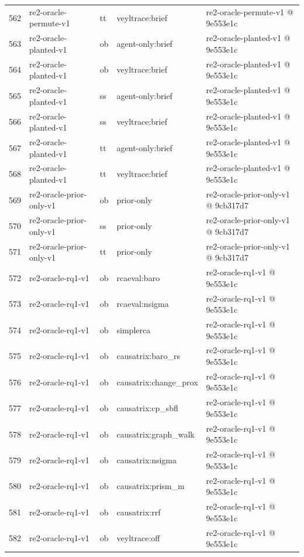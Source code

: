 \begin{longtable}{@{}r>{\raggedright\arraybackslash}p{87.0pt}>{\raggedright\arraybackslash}p{18.0pt}>{\raggedright\arraybackslash}p{63.0pt}>{\raggedright\arraybackslash}p{108.0pt}@{}}
562 & re2-oracle-permute-v1 & tt & veyltrace:brief & re2-oracle-permute-v1 @ 9e553e1c \\
563 & re2-oracle-planted-v1 & ob & agent-only:brief & re2-oracle-planted-v1 @ 9e553e1c \\
564 & re2-oracle-planted-v1 & ob & veyltrace:brief & re2-oracle-planted-v1 @ 9e553e1c \\
565 & re2-oracle-planted-v1 & ss & agent-only:brief & re2-oracle-planted-v1 @ 9e553e1c \\
566 & re2-oracle-planted-v1 & ss & veyltrace:brief & re2-oracle-planted-v1 @ 9e553e1c \\
567 & re2-oracle-planted-v1 & tt & agent-only:brief & re2-oracle-planted-v1 @ 9e553e1c \\
568 & re2-oracle-planted-v1 & tt & veyltrace:brief & re2-oracle-planted-v1 @ 9e553e1c \\
569 & re2-oracle-prior-only-v1 & ob & prior-only & re2-oracle-prior-only-v1 @ 9cb317d7 \\
570 & re2-oracle-prior-only-v1 & ss & prior-only & re2-oracle-prior-only-v1 @ 9cb317d7 \\
571 & re2-oracle-prior-only-v1 & tt & prior-only & re2-oracle-prior-only-v1 @ 9cb317d7 \\
572 & re2-oracle-rq1-v1 & ob & rcaeval:baro & re2-oracle-rq1-v1 @ 9e553e1c \\
573 & re2-oracle-rq1-v1 & ob & rcaeval:nsigma & re2-oracle-rq1-v1 @ 9e553e1c \\
574 & re2-oracle-rq1-v1 & ob & simplerca & re2-oracle-rq1-v1 @ 9e553e1c \\
575 & re2-oracle-rq1-v1 & ob & causatrix:baro\_rs & re2-oracle-rq1-v1 @ 9e553e1c \\
576 & re2-oracle-rq1-v1 & ob & causatrix:change\_prox & re2-oracle-rq1-v1 @ 9e553e1c \\
577 & re2-oracle-rq1-v1 & ob & causatrix:cp\_sbfl & re2-oracle-rq1-v1 @ 9e553e1c \\
578 & re2-oracle-rq1-v1 & ob & causatrix:graph\_walk & re2-oracle-rq1-v1 @ 9e553e1c \\
579 & re2-oracle-rq1-v1 & ob & causatrix:nsigma & re2-oracle-rq1-v1 @ 9e553e1c \\
580 & re2-oracle-rq1-v1 & ob & causatrix:prism\_m & re2-oracle-rq1-v1 @ 9e553e1c \\
581 & re2-oracle-rq1-v1 & ob & causatrix:rrf & re2-oracle-rq1-v1 @ 9e553e1c \\
582 & re2-oracle-rq1-v1 & ob & veyltrace:off & re2-oracle-rq1-v1 @ 9e553e1c \\

\end{longtable}
